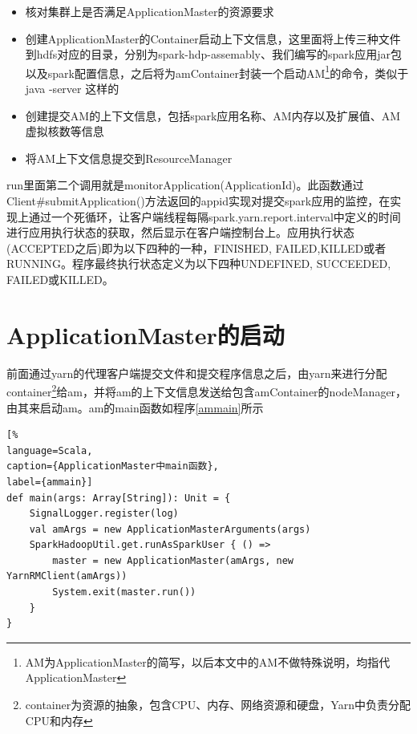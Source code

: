 \begin{itemize}
\begin{figure}[H]
	\end{figure}
	\item 核对集群上是否满足ApplicationMaster的资源要求
	\item 创建ApplicationMaster的Container启动上下文信息，这里面将上传三种文件到hdfs对应的目录，分别为spark-hdp-assemably、我们编写的spark应用jar包以及spark配置信息，之后将为amContainer封装一个启动AM\footnote{AM为ApplicationMaster的简写，以后本文中的AM不做特殊说明，均指代ApplicationMaster}的命令，类似于java -server 这样的
	\item 创建提交AM的上下文信息，包括spark应用名称、AM内存以及扩展值、AM虚拟核数等信息
	\item 将AM上下文信息提交到ResourceManager
\end{itemize}

run里面第二个调用就是monitorApplication(ApplicationId)。此函数通过Client\#submitApplication()方法返回的appid实现对提交spark应用的监控，在实现上通过一个死循环，让客户端线程每隔spark.yarn.report.interval中定义的时间进行应用执行状态的获取，然后显示在客户端控制台上。应用执行状态(ACCEPTED之后)即为以下四种的一种，FINISHED, FAILED,KILLED或者RUNNING。程序最终执行状态定义为以下四种UNDEFINED, SUCCEEDED, FAILED或KILLED。
\section{ApplicationMaster的启动}
前面通过yarn的代理客户端提交文件和提交程序信息之后，由yarn来进行分配container\footnote{container为资源的抽象，包含CPU、内存、网络资源和硬盘，Yarn中负责分配CPU和内存}给am，并将am的上下文信息发送给包含amContainer的nodeManager，由其来启动am。am的main函数如程序\ref{ammain}所示
\begin{lstlisting}[%
language=Scala,
caption={ApplicationMaster中main函数},
label={ammain}]
def main(args: Array[String]): Unit = {
	SignalLogger.register(log)
	val amArgs = new ApplicationMasterArguments(args)
	SparkHadoopUtil.get.runAsSparkUser { () =>
    	master = new ApplicationMaster(amArgs, new YarnRMClient(amArgs))
    	System.exit(master.run())
	}
}
\end{lstlisting}

